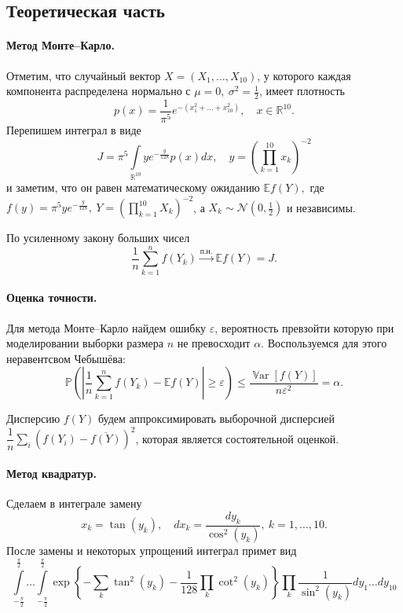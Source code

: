 \documentclass[16pt]{article}
\DeclareMathOperator*{\Var}{\mathbb{V}ar}
\newcommand\Real{\mathbb{R}}
\newcommand\Sum[2]{\sum\limits_{#1}^{#2}}
\begin{document}
\subsection{Теоретическая часть}
\paragraph{Метод Монте--Карло.} Отметим, что случайный вектор $X = (X_1, \ldots, X_{10})$, у которого каждая компонента распределена нормально с $\mu = 0,\ \sigma^2 = \frac12$, имеет плотность
$$p(x) = \frac{1}{\pi^5}e^{-(x_1^2 + \ldots + x_{10}^2)}, \quad x \in \Real^{10}.$$
Перепишем интеграл в виде
$$ J = \pi^5 \int\limits_{\mathbb{R}^{10}} ye^{-\frac{y}{128}}p(x)dx, \quad y = \left(\prod_{k=1}^{10} x_k\right)^{-2}$$
и заметим, что он равен математическому ожиданию
$\mathbb{E}f(Y),$
где $f(y) = \pi^5 y e^{-\frac{y}{128}},\ Y = \left(\prod_{k=1}^{10} X_k\right)^{-2}$, а $X_k \sim \mathcal{N}\left(0, \frac12\right)$ и независимы.

По усиленному закону больших чисел $$\dfrac1n \Sum{k=1}{n} f(Y_k) \overset{\text{п.н.}}{\rightarrow} \mathbb{E}f(Y) = J.$$

\paragraph{Оценка точности.} Для метода Монте--Карло найдем ошибку $\varepsilon$, вероятность превзойти которую при моделировании выборки размера $n$ не превосходит $\alpha$. Воспользуемся для этого неравентсвом Чебышёва:
$$\mathbb{P}\left(\left|\dfrac{1}{n}\sum_{k=1}^nf(Y_k) - \mathbb{E}f(Y)\right| \geq \varepsilon \right) \leq \dfrac{\Var [f(Y)]}{n\varepsilon^2} = \alpha.$$

Дисперсию $f(Y)$ будем аппроксимировать выборочной дисперсией $\dfrac{1}{n}\sum\limits_i \left(f(Y_i) - \overline{f(Y)}\right)^2$, которая является состоятельной оценкой.

\paragraph{Метод квадратур.} Сделаем в интеграле замену 
$$x_k = \tan\left(y_k\right), \quad dx_k = \dfrac{dy_k}{\cos^2\left(y_k\right)}, \ k = 1, \ldots, 10.$$
После замены и некоторых упрощений интеграл примет вид
$$\int\limits_{-\frac{\pi}{2}}^{\frac{\pi}{2}}\ldots\int\limits_{-\frac{\pi}{2}}^{\frac{\pi}{2}} \exp \left\{-\sum\limits_k \tan^2(y_k) - \dfrac{1}{128}\prod\limits_k \cot^2 (y_k)\right\}\prod\limits_k \dfrac{1}{\sin^2(y_k)}dy_1\ldots dy_{10}$$
\end{document}
